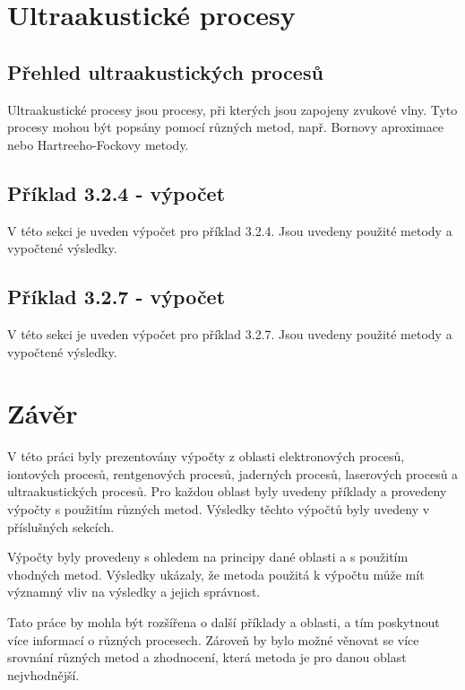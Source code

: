 \documentclass{article}
\begin{document}
\section{Ultraakustické procesy}

\subsection{Přehled ultraakustických procesů}

Ultraakustické procesy jsou procesy, při kterých jsou zapojeny zvukové vlny. Tyto procesy mohou být popsány pomocí různých metod, např. Bornovy aproximace nebo Hartreeho-Fockovy metody.

\subsection{Příklad 3.2.4 - výpočet}

V této sekci je uveden výpočet pro příklad 3.2.4. Jsou uvedeny použité metody a vypočtené výsledky.

\subsection{Příklad 3.2.7 - výpočet}

V této sekci je uveden výpočet pro příklad 3.2.7. Jsou uvedeny použité metody a vypočtené výsledky.

\section{Závěr}

V této práci byly prezentovány výpočty z oblasti elektronových procesů, iontových procesů, rentgenových procesů, 
jaderných procesů, laserových procesů a ultraakustických procesů. Pro každou oblast byly uvedeny příklady a provedeny výpočty s použitím různých metod. Výsledky těchto výpočtů byly uvedeny v příslušných sekcích.

Výpočty byly provedeny s ohledem na principy dané oblasti a s použitím vhodných metod. Výsledky ukázaly, že metoda použitá k výpočtu může mít významný vliv na výsledky a jejich správnost.

Tato práce by mohla být rozšířena o další příklady a oblasti, a tím poskytnout více informací o různých procesech. Zároveň by bylo možné věnovat se více srovnání různých metod a zhodnocení, která metoda je pro danou oblast nejvhodnější.
\end{document}
